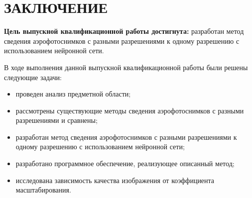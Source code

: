 \chapter*{ЗАКЛЮЧЕНИЕ}

\textbf{Цель выпускной квалификационной работы достигнута:} разработан метод сведения аэрофотоснимков с разными разрешениями к одному разрешению с использованием нейронной сети.

В ходе выполнения данной выпускной квалификационной работы были решены следующие задачи:

\begin{itemize}[label=---]
    \item проведен анализ предметной области;
    \item рассмотрены существующие методы сведения аэрофотоснимков с разными разрешениями и сравнены;
    \item разработан метод сведения аэрофотоснимков с разными разрешениями к одному разрешению с использованием нейронной сети;
    \item разработано программное обеспечение, реализующее описанный метод;
    \item исследована зависимость качества изображения от коэффициента масштабирования.
\end{itemize}
